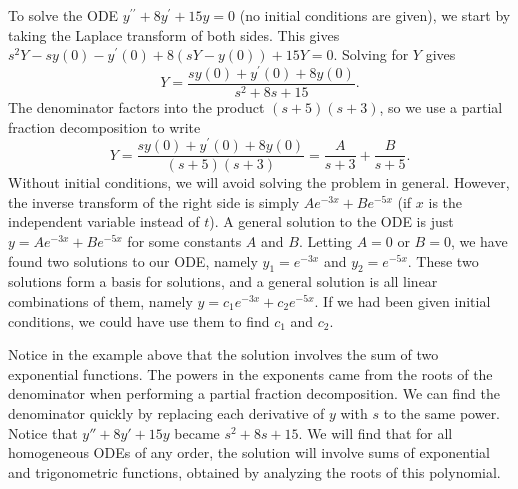 \begin{example}
To solve the ODE $y^{\prime\prime}+8y^\prime+15y=0$ (no initial conditions are given), we start by taking the Laplace transform of both sides. This gives $s^2Y-sy(0)-y^\prime(0) + 8(sY-y(0))+15Y=0$.  Solving for $Y$ gives $$Y = \frac{sy(0)+y^\prime(0)+8y(0)}{s^2+8s+15}.$$  The denominator factors into the product $(s+5)(s+3)$, so we use a partial fraction decomposition to write 
$$Y = \frac{sy(0)+y^\prime(0)+8y(0)}{(s+5)(s+3)} = \frac{A}{s+3}+\frac{B}{s+5}.$$
Without initial conditions, we will avoid solving the problem in general. However, the inverse transform of the right side is simply $Ae^{-3x}+Be^{-5x}$ (if $x$ is the independent variable instead of $t$). A general solution to the ODE is just $y=Ae^{-3x}+Be^{-5x}$ for some constants $A$ and $B$. Letting $A=0$ or $B=0$, we have found two solutions to our ODE, namely $y_1=e^{-3x}$ and $y_2=e^{-5x}$. These two solutions form a basis for solutions, and a general solution is all linear combinations of them, namely $y=c_1e^{-3x}+c_2e^{-5x}$. If we had been given initial conditions, we could have use them to find $c_1$ and $c_2$.  
\end{example}

Notice in the example above that the solution involves the sum of two exponential functions. 
The powers in the exponents came from the roots of the denominator when performing a partial fraction decomposition.  We can find the denominator quickly by replacing each derivative of $y$ with $s$ to the same power.  Notice that $y''+8y'+15y$ became
$s^{2}+8s+15$. We will find that for all homogeneous ODEs of any order, the solution will involve sums of exponential and trigonometric functions, obtained by analyzing the roots of this polynomial. 


